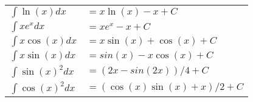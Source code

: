 \begin{table}[H]
\centering
\begin{tabular}{p{3cm}p{4cm}}
$\int \ln(x) dx$ & $=x\ln(x)-x+C$ \\
$\int x e^x dx$ & $=x e^x-x+C$ \\
$\int x \cos(x) dx$ & $=x\sin(x)+\cos(x)+C$ \\
$\int x \sin(x) dx$ & $=sin(x)-x\cos(x)+C$ \\
$\int \sin(x)^2 dx$ & $=(2x-sin(2x))/4+C$ \\
$\int \cos(x)^2 dx$ & $=(\cos(x)\sin(x)+x)/2+C$ \\
\end{tabular}
\end{table}
